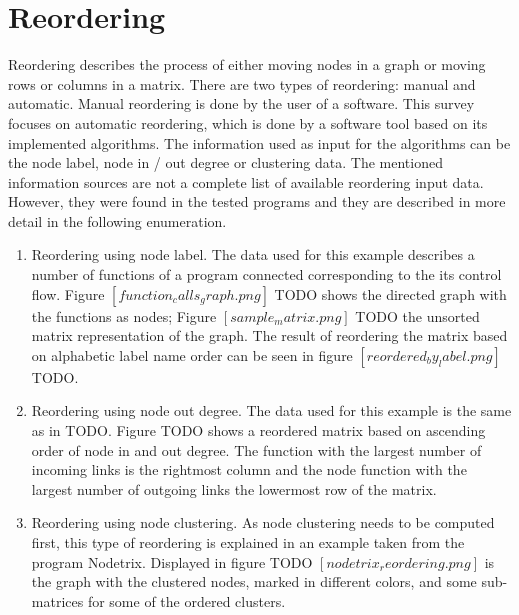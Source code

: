 %
%
% 
% 
% 


\chapter{Reordering}\label{chap:reordering}

Reordering describes the process of either moving nodes in a graph or moving rows or columns in a matrix. There are two types of reordering: manual and automatic. Manual reordering is done by the user of a software. This survey focuses on automatic reordering, which is done by a software tool based on its implemented algorithms. The information used as input for the algorithms can be the node label, node in / out degree or clustering data. The mentioned information sources are not a complete list of available reordering input data. However, they were found in the tested programs and they are described in more detail in the following enumeration.

\begin{enumerate}
	\item Reordering using node label. The data used for this example describes a number of functions of a program connected corresponding to the its control flow. Figure $[function_calls_graph.png]$ TODO shows the directed graph with the functions as nodes; Figure $[sample_matrix.png]$ TODO the unsorted matrix representation of the graph. The result of reordering the matrix based on alphabetic label name order can be seen in figure $[reordered_by_label.png]$ TODO.
	
	\item Reordering using node out degree. The data used for this example is the same as in TODO. Figure TODO shows a reordered matrix based on ascending order of node in and out degree. The function with the largest number of incoming links is the rightmost column and the node function with the largest number of outgoing links the lowermost row of the matrix.

	\item Reordering using node clustering. As node clustering needs to be computed first, this type of reordering is explained in an example taken from the program Nodetrix. Displayed in figure TODO $[nodetrix_reordering.png]$ is the graph with the clustered nodes, marked in different colors, and some sub-matrices for some of the ordered clusters.
\end{enumerate}

